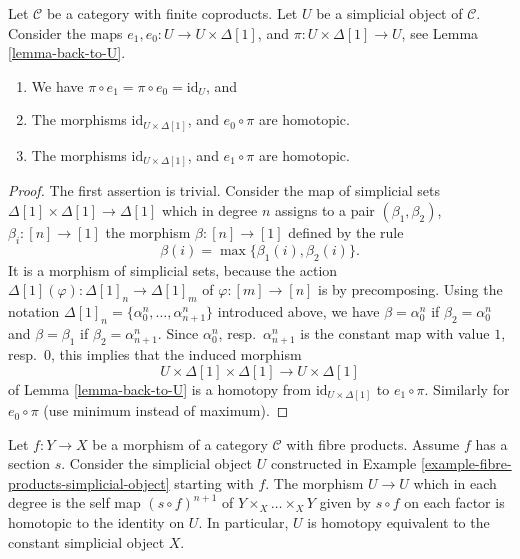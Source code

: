 \begin{lemma}
\label{lemma-contractible}
Let $\mathcal{C}$ be a category with finite coproducts.
Let $U$ be a simplicial object of $\mathcal{C}$.
Consider the maps $e_1, e_0 : U \to U \times \Delta[1]$,
and $\pi : U \times \Delta[1] \to U$, see
Lemma \ref{lemma-back-to-U}.
\begin{enumerate}
\item We have $\pi \circ e_1 = \pi \circ e_0 = \text{id}_U$, and
\item The morphisms $\text{id}_{U \times \Delta[1]}$,
and $e_0 \circ \pi$ are homotopic.
\item The morphisms $\text{id}_{U \times \Delta[1]}$,
and $e_1 \circ \pi$ are homotopic.
\end{enumerate}
\end{lemma}

\begin{proof}
The first assertion is trivial. Consider the map of simplicial sets
$\Delta[1] \times \Delta[1] \longrightarrow \Delta[1]$
which in degree $n$ assigns to a pair $(\beta_1, \beta_2)$,
$\beta_i : [n] \to [1]$ the morphism
$\beta : [n] \to [1]$ defined by the rule
$$
\beta(i) = \max\{\beta_1(i), \beta_2(i)\}.
$$
It is a morphism of simplicial sets, because the action
$\Delta[1](\varphi) : \Delta[1]_n \to \Delta[1]_m$
of $\varphi : [m] \to [n]$ is by precomposing.
Using the notation $\Delta[1]_n = \{\alpha^n_0, \ldots, \alpha^n_{n + 1}\}$
introduced above, we have $\beta = \alpha^n_0$ if $\beta_2 = \alpha^n_0$
and $\beta = \beta_1$ if $\beta_2 = \alpha^n_{n + 1}$.
Since $\alpha^n_0$, resp.\ $\alpha^n_{n + 1}$ is the constant map
with value $1$, resp.\ $0$, this implies that the induced morphism
$$
U \times \Delta[1] \times \Delta[1]
\longrightarrow
U \times \Delta[1]
$$
of Lemma \ref{lemma-back-to-U}
is a homotopy from $\text{id}_{U \times \Delta[1]}$ to $e_1 \circ \pi$.
Similarly for $e_0 \circ \pi$ (use minimum instead of maximum).
\end{proof}

\begin{lemma}
\label{lemma-fibre-products-simplicial-object-w-section}
Let $f : Y \to X$ be a morphism of a category $\mathcal{C}$ with
fibre products. Assume $f$ has a section $s$. Consider the
simplicial object $U$ constructed in
Example \ref{example-fibre-products-simplicial-object}
starting with $f$. The morphism $U \to U$ which in each degree
is the self map $(s \circ f)^{n + 1}$ of $Y \times_X \ldots \times_X Y$
given by $s \circ f$ on each factor is homotopic to the identity on $U$.
In particular, $U$ is homotopy equivalent to the constant
simplicial object $X$.
\end{lemma}


